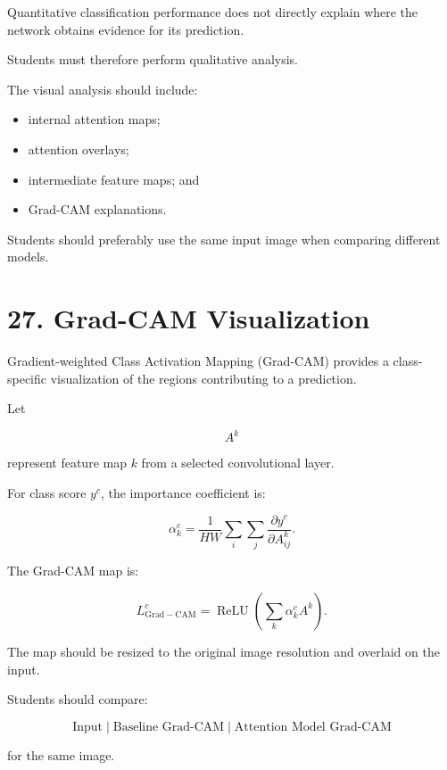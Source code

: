 \documentclass[10pt]{article}
\begin{document}
Quantitative classification performance does not directly explain where the
network obtains evidence for its prediction.

Students must therefore perform qualitative analysis.

The visual analysis should include:

\begin{itemize}

\item internal attention maps;

\item attention overlays;

\item intermediate feature maps; and

\item Grad-CAM explanations.

\end{itemize}

Students should preferably use the same input image when comparing different
models.

\section*{27. Grad-CAM Visualization}

Gradient-weighted Class Activation Mapping (Grad-CAM) provides a
class-specific visualization of the regions contributing to a prediction.

Let

\[
A^k
\]

represent feature map $k$ from a selected convolutional layer.

For class score $y^c$, the importance coefficient is:

\[
\alpha_k^c
=
\frac{1}{HW}
\sum_i
\sum_j
\frac{\partial y^c}
{\partial A_{ij}^k}.
\]

The Grad-CAM map is:

\[
L_{\mathrm{Grad-CAM}}^c
=
\operatorname{ReLU}
\left(
\sum_k
\alpha_k^c A^k
\right).
\]

The map should be resized to the original image resolution and overlaid on
the input.

Students should compare:

\[
\boxed{
\text{Input}
\;|\;
\text{Baseline Grad-CAM}
\;|\;
\text{Attention Model Grad-CAM}
}
\]

for the same image.
\end{document}

